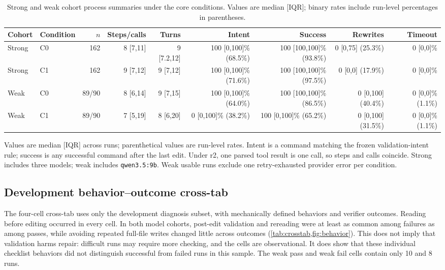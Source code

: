 \documentclass[10pt]{article}
\newcommand{\QwenWeak}{\texttt{qwen3.5:\allowbreak 9b}}
\begin{document}
\begin{table}[H]
\centering
\scriptsize
\begin{threeparttable}
\caption{Strong and weak cohort process summaries under the core conditions. Values are median [IQR]; binary rates include run-level percentages in parentheses.}
\label{tab:process}
\setlength{\tabcolsep}{3pt}
\begin{tabular*}{\textwidth}{@{\extracolsep{\fill}}llrrrrrrr@{}}
\toprule
Cohort & Condition & \(n\) & Steps/calls & Turns & Intent & Success & Rewrites & Timeout \\
\midrule
Strong & C0 & 162 & 8 [7,11] & 9 [7.2,12] & 100 [0,100]\% (68.5\%) & 100 [100,100]\% (93.8\%) & 0 [0,75] (25.3\%) & 0 [0,0]\% \\
Strong & C1 & 162 & 9 [7,12] & 9 [7,12] & 100 [0,100]\% (71.6\%) & 100 [100,100]\% (97.5\%) & 0 [0,0] (17.9\%) & 0 [0,0]\% \\
Weak & C0 & 89/90 & 8 [6,14] & 9 [7,15] & 100 [0,100]\% (64.0\%) & 100 [100,100]\% (86.5\%) & 0 [0,100] (40.4\%) & 0 [0,0]\% (1.1\%) \\
Weak & C1 & 89/90 & 7 [5,19] & 8 [6,20] & 0 [0,100]\% (38.2\%) & 100 [0,100]\% (65.2\%) & 0 [0,100] (31.5\%) & 0 [0,0]\% (1.1\%) \\
\bottomrule
\end{tabular*}
\begin{tablenotes}[flushleft]\footnotesize
\item Values are median [IQR] across runs; parenthetical values are run-level rates. Intent is a command matching the frozen validation-intent rule; success is any successful command after the last edit. Under r2, one parsed tool result is one call, so steps and calls coincide. Strong includes three models; weak includes \QwenWeak{}. Weak usable runs exclude one retry-exhausted provider error per condition.
\end{tablenotes}
\end{threeparttable}
\end{table}

\subsection{Development behavior--outcome cross-tab}
The four-cell cross-tab uses only the development diagnosis subset, with mechanically defined behaviors and verifier outcomes. Reading before editing occurred in every cell. In both model cohorts, post-edit validation and rereading were at least as common among failures as among passes, while avoiding repeated full-file writes changed little across outcomes (\cref{tab:crosstab,fig:behavior}). This does not imply that validation harms repair: difficult runs may require more checking, and the cells are observational. It does show that these individual checklist behaviors did not distinguish successful from failed runs in this sample. The weak pass and weak fail cells contain only 10 and 8 runs.
\end{document}
